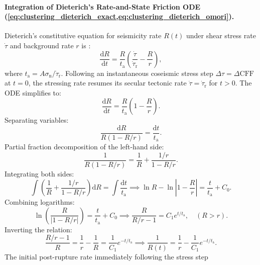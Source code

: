 \paragraph{Integration of Dieterich's Rate-and-State Friction ODE
(\cref{eq:clustering_dieterich_exact,eq:clustering_dieterich_omori}).}
Dieterich's constitutive equation for seismicity rate $R(t)$ under
shear stress rate $\dot{\tau}$
and background rate $r$ is \parencite{dieterich1994}:
\begin{equation}
  \frac{\mathrm{d}R}{\mathrm{d}t} = \frac{R}{t_{\mathrm{a}}} \left(
  \frac{\dot{\tau}}{\dot{\tau}_{\mathrm{r}}} - \frac{R}{r} \right),
  \label{eq:supp_dieterich_ode}
\end{equation}
where $t_{\mathrm{a}} = A\sigma_{\mathrm{n}}/\dot{\tau}_{\mathrm{r}}$.
Following an instantaneous coseismic stress step $\Delta\tau =
\Delta\mathrm{CFF}$ at $t = 0$,
the stressing rate resumes its secular tectonic rate $\dot{\tau} =
\dot{\tau}_{\mathrm{r}}$ for $t > 0$.
The ODE simplifies to:
\begin{equation}
  \frac{\mathrm{d}R}{\mathrm{d}t} = \frac{R}{t_{\mathrm{a}}} \left(
  1 - \frac{R}{r} \right).
\end{equation}
Separating variables:
\begin{equation}
  \frac{\mathrm{d}R}{R(1 - R/r)} = \frac{\mathrm{d}t}{t_{\mathrm{a}}}.
\end{equation}
Partial fraction decomposition of the left-hand side:
\begin{equation}
  \frac{1}{R(1 - R/r)} = \frac{1}{R} + \frac{1/r}{1 - R/r}.
\end{equation}
Integrating both sides:
\begin{equation}
  \int \left( \frac{1}{R} + \frac{1/r}{1 - R/r} \right)\mathrm{d}R =
  \int \frac{\mathrm{d}t}{t_{\mathrm{a}}}
  \implies \ln R - \ln\left| 1 - \frac{R}{r} \right| =
  \frac{t}{t_{\mathrm{a}}} + C_0.
\end{equation}
Combining logarithms:
\begin{equation}
  \ln\left( \frac{R}{|1 - R/r|} \right) = \frac{t}{t_{\mathrm{a}}} +
  C_0 \implies \frac{R}{R/r - 1} = C_1 e^{t/t_{\mathrm{a}}}, \quad (R > r).
\end{equation}
Inverting the relation:
\begin{equation}
  \frac{R/r - 1}{R} = \frac{1}{r} - \frac{1}{R} = \frac{1}{C_1}
  e^{-t/t_{\mathrm{a}}}
  \implies \frac{1}{R(t)} = \frac{1}{r} - \frac{1}{C_1} e^{-t/t_{\mathrm{a}}}.
\end{equation}
The initial post-rupture rate immediately following the stress step
